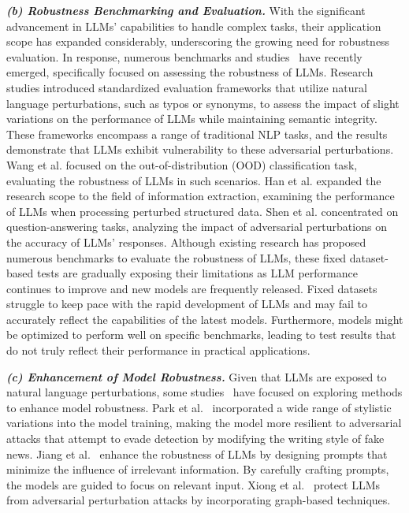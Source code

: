 \textit{\textbf{(b) Robustness Benchmarking and Evaluation.}} With the significant advancement in LLMs' capabilities to handle complex tasks, their application scope has expanded considerably, underscoring the growing need for robustness evaluation. In response, numerous benchmarks and studies~\cite{zhu2023promptbench,liu2023trustworthy,wang2023robustness,robustness1,robustness2} have recently emerged, specifically focused on assessing the robustness of LLMs. Research studies \cite{zhu2023promptbench,liu2023trustworthy} introduced standardized evaluation frameworks that utilize natural language perturbations, such as typos or synonyms, to assess the impact of slight variations on the performance of LLMs while maintaining semantic integrity. These frameworks encompass a range of traditional NLP tasks, and the results demonstrate that LLMs exhibit vulnerability to these adversarial perturbations.
Wang et al. \cite{wang2023robustness} focused on the out-of-distribution (OOD) classification task, evaluating the robustness of LLMs in such scenarios.
Han et al. \cite{robustness1} expanded the research scope to the field of information extraction, examining the performance of LLMs when processing perturbed structured data. 
Shen et al. \cite{robustness2} concentrated on question-answering tasks, analyzing the impact of adversarial perturbations on the accuracy of LLMs' responses. Although existing research has proposed numerous benchmarks to evaluate the robustness of LLMs, these fixed dataset-based tests are gradually exposing their limitations as LLM performance continues to improve and new models are frequently released. Fixed datasets struggle to keep pace with the rapid development of LLMs and may fail to accurately reflect the capabilities of the latest models. Furthermore, models might be optimized to perform well on specific benchmarks, leading to test results that do not truly reflect their performance in practical applications.

\textit{\textbf{(c) Enhancement of Model Robustness.}} Given that LLMs are exposed to natural language perturbations, some studies~\cite{park2024adversarial,jiang2024enhancing,xiong2024enhance} have focused on exploring methods to enhance model robustness.
Park et al.~\cite{park2024adversarial} incorporated a wide range of stylistic variations into the model training, making the model more resilient to adversarial attacks that attempt to evade detection by modifying the writing style of fake news.
Jiang et al.~\cite{jiang2024enhancing} enhance the robustness of LLMs by designing prompts that minimize the influence of irrelevant information. By carefully crafting prompts, the models are guided to focus on relevant input.
Xiong et al.~\cite{xiong2024enhance} protect LLMs from adversarial perturbation attacks by incorporating graph-based techniques.


